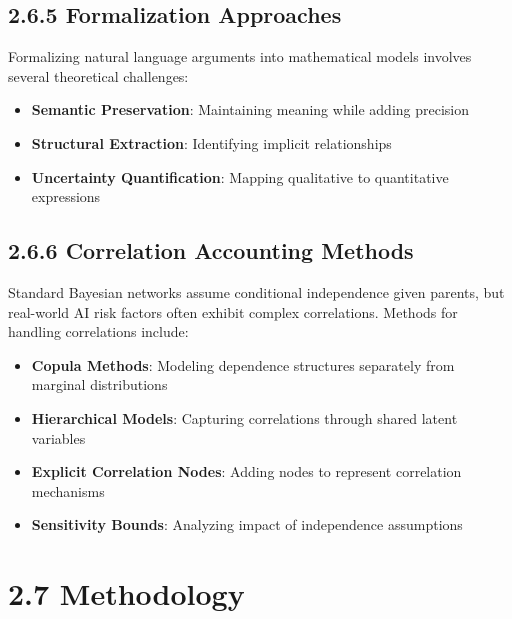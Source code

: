 \documentclass[
  11pt,
  letterpaper,
]{book}
\providecommand{\tightlist}{%
  \setlength{\itemsep}{0pt}\setlength{\parskip}{0pt}}
\begin{document}
\subsection*{2.6.5 Formalization Approaches}\label{sec-formalization}

Formalizing natural language arguments into mathematical models involves
several theoretical challenges:

\begin{itemize}
\tightlist
\item
  \textbf{Semantic Preservation}: Maintaining meaning while adding
  precision
\item
  \textbf{Structural Extraction}: Identifying implicit relationships
\item
  \textbf{Uncertainty Quantification}: Mapping qualitative to
  quantitative expressions
\end{itemize}

\textcite{pollock1995}

\subsection*{2.6.6 Correlation Accounting
Methods}\label{sec-correlation-methods}

Standard Bayesian networks assume conditional independence given
parents, but real-world AI risk factors often exhibit complex
correlations. Methods for handling correlations include:

\begin{itemize}
\tightlist
\item
  \textbf{Copula Methods}: Modeling dependence structures separately
  from marginal distributions
\item
  \textbf{Hierarchical Models}: Capturing correlations through shared
  latent variables
\item
  \textbf{Explicit Correlation Nodes}: Adding nodes to represent
  correlation mechanisms
\item
  \textbf{Sensitivity Bounds}: Analyzing impact of independence
  assumptions
\end{itemize}

\textcite{nelson2006}

\section*{2.7 Methodology}\label{sec-methodology}
\end{document}
